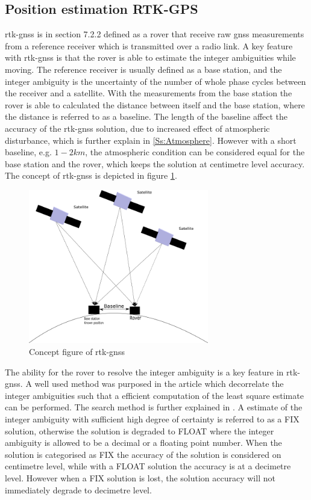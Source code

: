 \subsection{Position estimation RTK-GPS}\label{ss:rtk-gps}
\acrfull{rtk-gnss} is in \citep{misra2011global} section 7.2.2 defined as a rover that receive raw \gls{gnss} measurements from a reference receiver which is transmitted over a radio link. A key feature with \gls{rtk-gnss} is that the rover is able to estimate the integer ambiguities while moving. The reference receiver is usually defined as a base station, and the integer ambiguity is the uncertainty of the number of whole phase cycles between the receiver and a satellite. With the measurements from the base station the rover is able to calculated the distance between itself and the base station, where the distance is referred to as a baseline. The length of the baseline affect the accuracy of the \gls{rtk-gnss} solution, due to increased effect of atmospheric disturbance, which is further explain in \ref{Ss:Atmosphere}. However with a short baseline, e.g. $1-2 km$, the atmospheric condition can be considered equal for the base station and the rover, which keeps the solution  at centimetre level accuracy. The concept of \gls{rtk-gnss} is depicted in figure \ref{figure:RTK}.
\begin{figure}[H]
	\centering
		\includegraphics[width=0.7\textwidth]{figs/DGPS.png}
		\caption{Concept figure of \acrfull{rtk-gnss}}
		\label{figure:RTK}
\end{figure}
The ability for the rover to resolve the integer ambiguity is a key feature in \gls{rtk-gnss}. A well used method was purposed in the article \citep{teunissen1994new} which decorrelate the integer ambiguities such that a efficient computation of the least square estimate can be performed. The search method is further explained in \citep{teunissen1995least}. A estimate of the integer ambiguity with sufficient high degree of certainty is referred to as a FIX solution, otherwise the solution is degraded to FLOAT where the integer ambiguity is allowed to be a decimal or a floating point number. When the solution is categorised as FIX the accuracy of the solution is considered on centimetre level, while with a FLOAT solution the accuracy is at a decimetre level. However when a FIX solution is lost, the solution accuracy will not immediately degrade to decimetre level.


